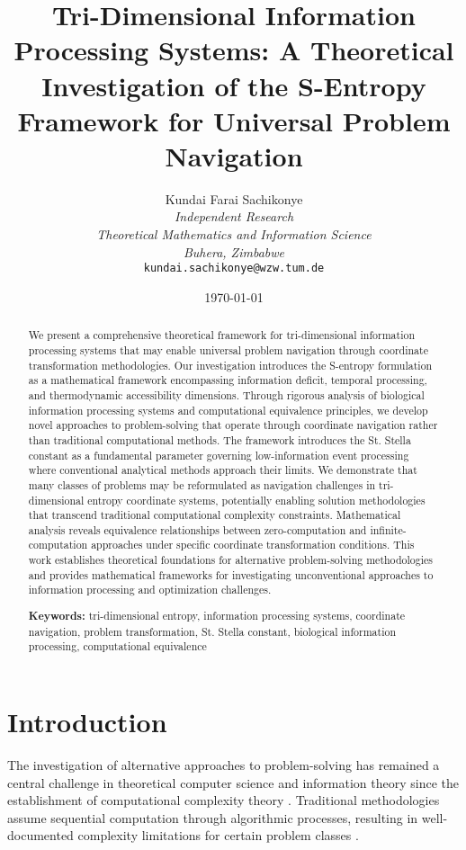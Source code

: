 \documentclass[11pt]{article}
\title{Tri-Dimensional Information Processing Systems: A Theoretical Investigation of the S-Entropy Framework for Universal Problem Navigation}
\author{
Kundai Farai Sachikonye\\
\textit{Independent Research}\\
\textit{Theoretical Mathematics and Information Science}\\
\textit{Buhera, Zimbabwe}\\
\texttt{kundai.sachikonye@wzw.tum.de}
}
\date{\today}
\begin{document}
\maketitle

\begin{abstract}
We present a comprehensive theoretical framework for tri-dimensional information processing systems that may enable universal problem navigation through coordinate transformation methodologies. Our investigation introduces the S-entropy formulation as a mathematical framework encompassing information deficit, temporal processing, and thermodynamic accessibility dimensions. Through rigorous analysis of biological information processing systems and computational equivalence principles, we develop novel approaches to problem-solving that operate through coordinate navigation rather than traditional computational methods. The framework introduces the St. Stella constant as a fundamental parameter governing low-information event processing where conventional analytical methods approach their limits. We demonstrate that many classes of problems may be reformulated as navigation challenges in tri-dimensional entropy coordinate systems, potentially enabling solution methodologies that transcend traditional computational complexity constraints. Mathematical analysis reveals equivalence relationships between zero-computation and infinite-computation approaches under specific coordinate transformation conditions. This work establishes theoretical foundations for alternative problem-solving methodologies and provides mathematical frameworks for investigating unconventional approaches to information processing and optimization challenges.

\textbf{Keywords:} tri-dimensional entropy, information processing systems, coordinate navigation, problem transformation, St. Stella constant, biological information processing, computational equivalence
\end{abstract}

\section{Introduction}

The investigation of alternative approaches to problem-solving has remained a central challenge in theoretical computer science and information theory since the establishment of computational complexity theory \cite{cook1971complexity}. Traditional methodologies assume sequential computation through algorithmic processes, resulting in well-documented complexity limitations for certain problem classes \cite{garey1979computers}.
\end{document}
